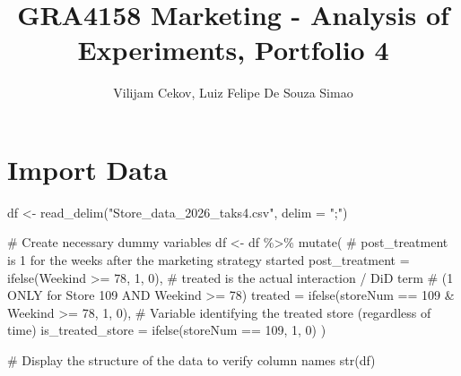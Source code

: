 \documentclass[
  letterpaper,
  DIV=11,
  numbers=noendperiod]{scrartcl}
\title{GRA4158 Marketing - Analysis of Experiments, Portfolio 4}
\author{Vilijam Cekov, Luiz Felipe De Souza Simao}
\date{}
\newenvironment{Shaded}{\begin{snugshade}}{\end{snugshade}}
\newcommand{\AttributeTok}[1]{\textcolor[rgb]{0.40,0.45,0.13}{#1}}
\newcommand{\CommentTok}[1]{\textcolor[rgb]{0.37,0.37,0.37}{#1}}
\newcommand{\DecValTok}[1]{\textcolor[rgb]{0.68,0.00,0.00}{#1}}
\newcommand{\FunctionTok}[1]{\textcolor[rgb]{0.28,0.35,0.67}{#1}}
\newcommand{\NormalTok}[1]{\textcolor[rgb]{0.00,0.23,0.31}{#1}}
\newcommand{\OtherTok}[1]{\textcolor[rgb]{0.00,0.23,0.31}{#1}}
\newcommand{\SpecialCharTok}[1]{\textcolor[rgb]{0.37,0.37,0.37}{#1}}
\newcommand{\StringTok}[1]{\textcolor[rgb]{0.13,0.47,0.30}{#1}}
\renewcommand*\contentsname{Table of contents}
\newcommand\contentsname{Table of contents}
\begin{document}
\maketitle

\renewcommand*\contentsname{Table of contents}
{
\hypersetup{linkcolor=}
\setcounter{tocdepth}{3}
\tableofcontents
}

\section{Import Data}\label{import-data}

\begin{Shaded}
\begin{Highlighting}[]
\NormalTok{df }\OtherTok{\textless{}{-}} \FunctionTok{read\_delim}\NormalTok{(}\StringTok{"Store\_data\_2026\_taks4.csv"}\NormalTok{, }\AttributeTok{delim =} \StringTok{";"}\NormalTok{)}

\CommentTok{\# Create necessary dummy variables}
\NormalTok{df }\OtherTok{\textless{}{-}}\NormalTok{ df }\SpecialCharTok{\%\textgreater{}\%}
  \FunctionTok{mutate}\NormalTok{(}
    \CommentTok{\# \textquotesingle{}post\_treatment\textquotesingle{} is 1 for the weeks after the marketing strategy started}
    \AttributeTok{post\_treatment =} \FunctionTok{ifelse}\NormalTok{(Weekind }\SpecialCharTok{\textgreater{}=} \DecValTok{78}\NormalTok{, }\DecValTok{1}\NormalTok{, }\DecValTok{0}\NormalTok{),}
    \CommentTok{\# \textquotesingle{}treated\textquotesingle{} is the actual interaction / DiD term }
    \CommentTok{\# (1 ONLY for Store 109 AND Weekind \textgreater{}= 78)}
    \AttributeTok{treated =} \FunctionTok{ifelse}\NormalTok{(storeNum }\SpecialCharTok{==} \DecValTok{109} \SpecialCharTok{\&}\NormalTok{ Weekind }\SpecialCharTok{\textgreater{}=} \DecValTok{78}\NormalTok{, }\DecValTok{1}\NormalTok{, }\DecValTok{0}\NormalTok{),}
    \CommentTok{\# Variable identifying the treated store (regardless of time)}
    \AttributeTok{is\_treated\_store =} \FunctionTok{ifelse}\NormalTok{(storeNum }\SpecialCharTok{==} \DecValTok{109}\NormalTok{, }\DecValTok{1}\NormalTok{, }\DecValTok{0}\NormalTok{)}
\NormalTok{  )}

\CommentTok{\# Display the structure of the data to verify column names}
\FunctionTok{str}\NormalTok{(df)}
\end{Highlighting}
\end{Shaded}
\end{document}

